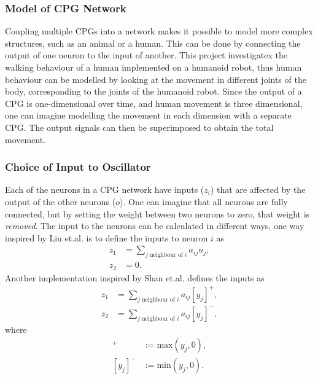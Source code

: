 \subsubsection{Model of CPG Network} \label{CPGnetwork}

Coupling multiple CPGs into a network makes it possible to model more complex structures, such as an animal or a human. This can be done by connecting the output of one neuron to the input of another. This project investigatex the walking behaviour of a human implemented on a humanoid robot, thus human behaviour can be modelled by looking at the movement in different joints of the body, corresponding to the joints of the humanoid robot. Since the output of a CPG is one-dimensional over time, and human movement is three dimensional, one can imagine modelling the movement in each dimension with a separate CPG. The output signals can then be superimposed to obtain the total movement.


\subsubsection{Choice of Input to Oscillator} \label{choiseOfInputToOscillator}
Each of the neurons in a CPG network have inputs ($z_i$) that are affected by the output of the other neurons ($o$). One can imagine that all neurons are fully connected, but by setting the weight between two neurons to zero, that weight is \textit{removed}. The input to the neurons can be calculated in different ways, one way inspired by Liu et.al. \cite{liu} is to define the inputs to neuron $i$ as
\begin{align}
z_1 &= \sum_{j \text{ neighbour of } i} a_{ij}u_j, \\
z_2 &= 0.
\end{align}
Another implementation inspired by Shan et.al. \cite{shan} defines the inputs as
\begin{align}
z_1 &= \sum_{j \text{ neighbour of } i} a_{ij}[y_j]^+, \\
z_2 &= \sum_{j \text{ neighbour of } i} a_{ij}[y_j]^-,
\end{align}
where 
\begin{align}
[y_j]^+ &:= \text{max}(y_j,0), \\
[y_j]^- &:= \text{min}(y_j,0).
\end{align}

